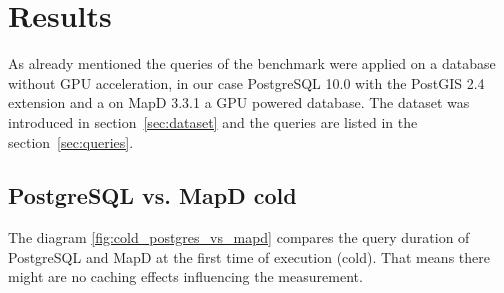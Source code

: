 \newpage
\section{Results}
As already mentioned the queries of the benchmark were applied on a database without GPU acceleration,
in our case PostgreSQL 10.0 with the PostGIS 2.4 extension and a on MapD 3.3.1 a GPU powered database.
The dataset was introduced in section~\ref{sec:dataset} and the queries are listed in the section~\ref{sec:queries}.

\subsection{PostgreSQL vs. MapD cold}
The diagram \ref{fig:cold_postgres_vs_mapd} compares the query duration of PostgreSQL and MapD at the first time of execution (cold).
That means there might are no caching effects influencing the measurement.

